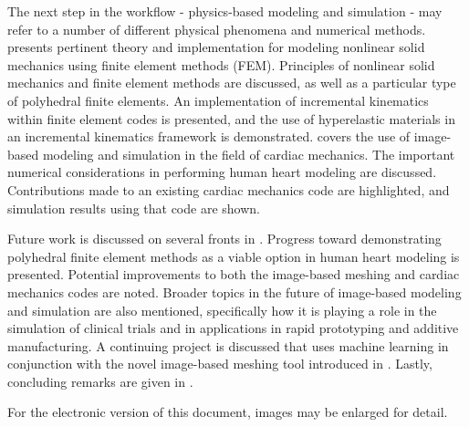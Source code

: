 The next step in the workflow - physics-based modeling and simulation - may refer to a number of different physical phenomena and numerical methods.  presents pertinent theory and implementation for modeling nonlinear solid mechanics using finite element methods (FEM). Principles of nonlinear solid mechanics and finite element methods are discussed, as well as a particular type of polyhedral finite elements. An implementation of incremental kinematics within finite element codes is presented, and the use of hyperelastic materials in an incremental kinematics framework is demonstrated.  covers the use of image-based modeling and simulation in the field of cardiac mechanics. The important numerical considerations in performing human heart modeling are discussed. Contributions made to an existing cardiac mechanics code are highlighted, and simulation results using that code are shown.

Future work is discussed on several fronts in . Progress toward demonstrating polyhedral finite element methods as a viable option in human heart modeling is presented. Potential improvements to both the image-based meshing and cardiac mechanics codes are noted. Broader topics in the future of image-based modeling and simulation are also mentioned, specifically how it is playing a role in the simulation of clinical trials and in applications in rapid prototyping and additive manufacturing. A continuing project is discussed that uses machine learning in conjunction with the novel image-based meshing tool introduced in . Lastly, concluding remarks are given in .

For the electronic version of this document, images may be enlarged for detail.
